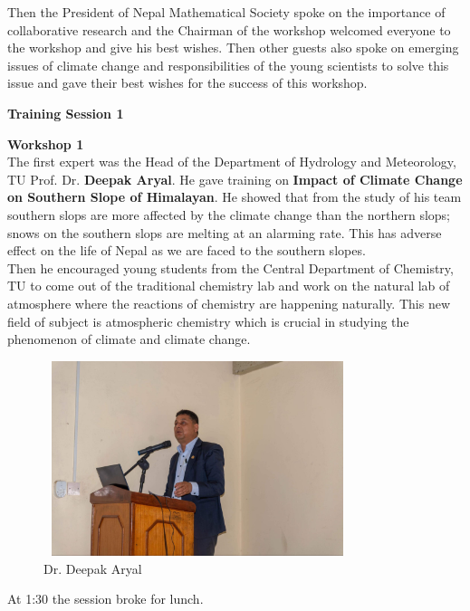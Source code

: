 \documentclass[a4paper,12pt]{report}
\begin{document}
\vspace*{5mm}
\noindent
Then the President of Nepal Mathematical Society spoke on the importance of collaborative research and the Chairman of the workshop welcomed everyone to the workshop and give his best wishes. Then other guests also spoke on emerging issues of climate change and responsibilities of the young scientists to solve this issue and gave their best wishes for the success of this workshop.
\clearpage

\begin{center}
  {\bfseries \Large Training Session 1}
\end{center}
\vspace{3mm}

{\bfseries \large Workshop 1}\\[3mm]
The first expert was the Head of the Department of Hydrology and Meteorology, TU Prof. Dr. \textbf{Deepak Aryal}. He gave training on \textbf{Impact of Climate Change on Southern Slope of Himalayan}. He showed that from the study of his team southern slops are more affected by the climate change than the northern slops; snows on the southern slops are melting at an alarming rate. This has adverse effect on the life of Nepal as we are faced to the southern slopes.\\
Then he encouraged young students from the Central Department of Chemistry, TU to come out of the traditional chemistry lab and work on the natural lab of atmosphere where the reactions of chemistry are happening naturally. This new field of subject is atmospheric chemistry which is crucial in studying the phenomenon of climate and climate change.
\vspace{3mm}

\begin{figure}[h!]
  \centering
  \includegraphics[width=9cm, height=5.7cm]{deepak.jpeg}
  \caption{Dr. Deepak Aryal}
\end{figure}

At 1:30 the session broke for lunch.\\
\end{document}

